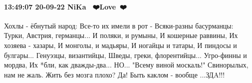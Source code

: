 \paragraph{13:49:07 20-09-22 NiKa 🤍💙❤️Love🤍💙❤️}

Хохлы - ёбнутый народ:
Все-то их имели в рот -
Всяки-разны басурманцы:
Турки, Австрия, германцы...
И поляки, и румыны,
И кошерные раввины,
Их хозяева - хазары,
И монголы, и мадьяры,
И ногайцы и татары,
И пиндосы и булгары...
Генуэзцы, византийцы,
Шведы, греки, флорентийцы...
Угро-финны и мордва,
Их *бли, как дважды-два...
НО...
"Всему виной москаль!"
Свинорылых, нам не жаль.
Жить без мозга плохо? Да!
Быть каклом - вообще ...ЗДA!!!

